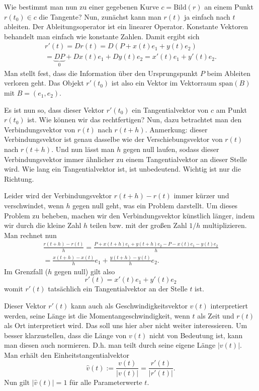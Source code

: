 \documentclass[a4paper,12pt,fleqn,dvipdfmx]{article}
\begin{document}
Wie bestimmt man nun zu einer gegebenen Kurve $c=\mathrm{Bild}(r)$
an einem Punkt $r(t_0)\in c$ die Tangente? Nun, zunächst kann man
$r(t)$ ja einfach nach $t$ ableiten. Der Ableitungsoperator
ist ein linearer Operator. Konstante Vektoren behandelt man einfach
wie konstante Zahlen. Damit ergibt sich
\begin{gather*}
r'(t) = Dr(t) = D(P+x(t)e_1+y(t)e_2)\\
= \underbrace{DP}_{0}+Dx(t)e_1+Dy(t)e_2 = x'(t)e_1+y'(t)e_2.
\end{gather*}
Man stellt fest, dass die Information über den Ursprungspunkt $P$
beim Ableiten verloren geht. Das Objekt $r'(t_0)$ ist also ein
Vektor im Vektorraum $\mathrm{span}(B)$ mit $B=(e_1,e_2)$.

Es ist nun so, dass dieser Vektor $r'(t_0)$ ein Tangentialvektor
von $c$ am Punkt $r(t_0)$ ist. Wie können wir das rechtfertigen?
Nun, dazu betrachtet man den Verbindungsvektor von $r(t)$ nach
$r(t+h)$. Anmerkung: dieser Verbindungsvektor ist genau dasselbe
wie der Verschiebungsvektor von $r(t)$ nach $r(t+h)$.
Und nun lässt man $h$ gegen null laufen, sodass dieser
Verbindungsvektor immer ähnlicher zu einem Tangentialvektor an dieser
Stelle wird. Wie lang ein Tangentialvektor ist, ist unbedeutend.
Wichtig ist nur die Richtung.

Leider wird der Verbindungsvektor $r(t+h)-r(t)$ immer kürzer
und verschwindet, wenn $h$ gegen null geht, was ein Problem darstellt.
Um dieses Problem zu beheben, machen wir den Verbindungsvektor
künstlich länger, indem wir durch die kleine Zahl $h$ teilen bzw. mit
der großen Zahl $1/h$ multiplizieren. Man rechnet nun
\begin{gather*}
\frac{r(t+h)-r(t)}{h}
= \frac{P+x(t+h)e_1+y(t+h)e_2-P-x(t)e_1-y(t)e_2}{h}\\
= \frac{x(t+h)-x(t)}{h}e_1 + \frac{y(t+h)-y(t)}{h}e_2.
\end{gather*}
Im Grenzfall ($h$ gegen null) gilt also
\[r'(t) = x'(t)e_1+y'(t)e_2\]
womit $r'(t)$ tatsächlich ein Tangentialvektor an der Stelle $t$
ist.

Dieser Vektor $r'(t)$ kann auch als Geschwindigkeitsvektor $v(t)$
interpretiert werden, seine Länge ist die Momentangeschwindigkeit,
wenn $t$ als Zeit und $r(t)$ als Ort interpretiert wird.
Das soll uns hier aber nicht weiter interessieren.
Um besser klarzustellen, dass die Länge von $v(t)$
nicht von Bedeutung ist, kann man diesen auch normieren.
D.h. man teilt durch seine eigene Länge $|v(t)|$.
Man erhält den Einheitstangentialvektor
\begin{equation}
\hat v(t) := \frac{v(t)}{|v(t)|} = \frac{r'(t)}{|r'(t)|}.
\end{equation}
Nun gilt $|\hat v(t)|=1$ für alle Parameterwerte $t$.
\end{document}
